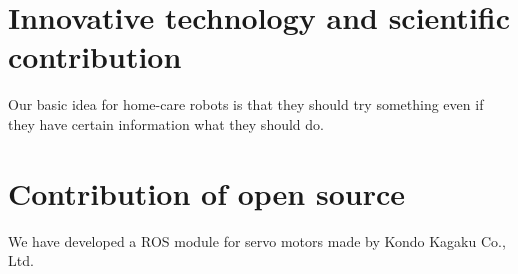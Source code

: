 \documentclass{llncs}
\begin{document}
\section{Innovative technology and scientific contribution}

Our basic idea for home-care robots is that they should try something
even if they have certain information what they should do.

\section{Contribution of open source}

We have developed a ROS module for servo motors made by Kondo Kagaku Co., Ltd.




\end{document}
